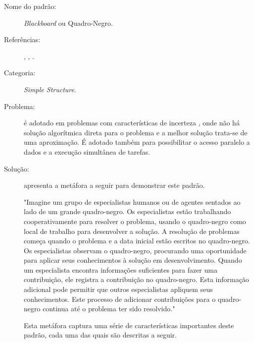 \begin{description}
  \item[Nome do padrão:] \textit{Blackboard} ou Quadro-Negro.
    \item[Referências:]    , , .
    \item[Categoria:] \textit{Simple Structure}.
    \item[Problema:] é adotado em problemas com características de incerteza \cite{dong2005event}, onde não há solução algorítmica direta para o problema e a melhor solução trata-se de uma aproximação. É adotado também para possibilitar o acesso paralelo a dados e a execução simultânea de tarefas.
    \item[Solução:]  apresenta a metáfora a seguir para demonstrar este padrão.

\begin{citacao}"Imagine um grupo de especialistas humanos ou de agentes sentados ao lado de um grande quadro-negro. Os especialistas estão trabalhando cooperativamente para resolver o problema, usando o quadro-negro como local de trabalho para desenvolver a solução. A resolução de problemas começa quando o problema e a data inicial estão escritos no quadro-negro. Os especialistas observam o quadro-negro, procurando uma oportunidade para aplicar seus conhecimentos à solução em desenvolvimento. Quando um especialista encontra informações suficientes para fazer uma contribuição, ele registra a contribuição no quadro-negro. Esta informação adicional pode permitir que outros especialistas apliquem seus conhecimentos. Este processo de adicionar contribuições para o quadro-negro continua até o problema ter sido resolvido."\cite{weiss1999multiagent}
\end{citacao}


Esta metáfora captura uma série de características importantes deste padrão, cada uma das quais são descritas a seguir.


\end{description}
